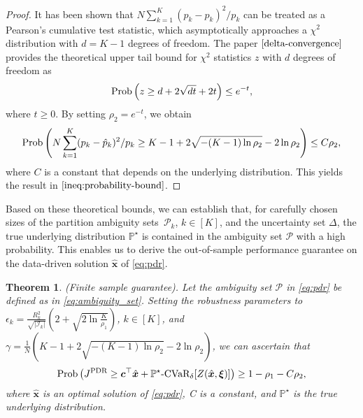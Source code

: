 \documentclass{article}
\newcommand{\PP}{\mathbb{P}}
\newtheorem{theorem}{Theorem}
\begin{document}
\begin{proof}
It has been shown that $N \sum_{k = 1}^{K} (p_k - \hat{p}_k)^2/p_k$ can be treated as a Pearson's cumulative test statistic, which asymptotically approaches a $\chi ^{2}$ distribution with $d = K - 1$ degrees of freedom. The paper $\cite{delta-convergence}$ provides the theoretical upper tail bound for $\chi^2$ statistics $z$ with $d$ degrees of freedom as
\begin{equation*}
    \textup{Prob} \left( z \geq d + 2\sqrt{dt} + 2t\right ) \leq e^{-t},
\end{equation*}
where $t \geq 0$. By setting $\rho_2 = e^{-t}$, we obtain 
\begin{equation*}
    \textup{Prob} \left( N \sum_{k = 1}^{K} (p_k - \hat{p}_k)^2/p_k \geq K - 1 + 2\sqrt{-(K - 1)\ln{\rho_2}} - 2\ln{\rho_2} \right ) \leq C\rho_2,
\end{equation*}
where $C$ is a constant that depends on the underlying distribution. This yields the result in $\eqref{ineq:probability-bound}$.
\end{proof}


Based on these theoretical bounds, we can establish that, for carefully chosen sizes of the partition ambiguity sets~$\mathcal{P}_k$, $k \in [K]$, and the uncertainty set $\Delta$, the true underlying distribution $\PP^{\star}$ is contained in the ambiguity set $\mathcal{P}$ with a high probability. This enables us to derive the out-of-sample performance guarantee on the data-driven solution $\hat{\bm x}$ of \eqref{eq:pdr}. %

\begin{theorem} \textup{(Finite sample guarantee).} \label{finite sample guarantee}
Let the ambiguity set $\mathcal{P}$ in \eqref{eq:pdr} be defined as in \eqref{eq:ambiguity_set}. Setting the robustness parameters to $\epsilon_k = \tfrac{R_k^2}{\sqrt{|\mathcal{I}_k|}} \left(2+\sqrt{2\ln\tfrac{K}{\rho_1}}\right)$, $k \in [K]$, and $\gamma = \tfrac{1}{N}\left (K - 1 + 2\sqrt{-(K-1)\ln{\rho_2}} - 2\ln{\rho_2}\right )$, we can ascertain that
\begin{equation*}
    \textup{Prob} \left( J^{\textup{PDR}}  \geq \bm c^\top \hat{\bm x} +  \PP^\star \textup{-CVaR}_\delta [Z(\hat{\bm x}, \bm \xi)] \right) \geq 1  - \rho_1 - C\rho_2,
\end{equation*}
where $\hat{\bm x}$ is an optimal solution of \eqref{eq:pdr}, C is a constant, and $\PP^\star$ is the true underlying distribution.

\end{theorem}
\end{document}
